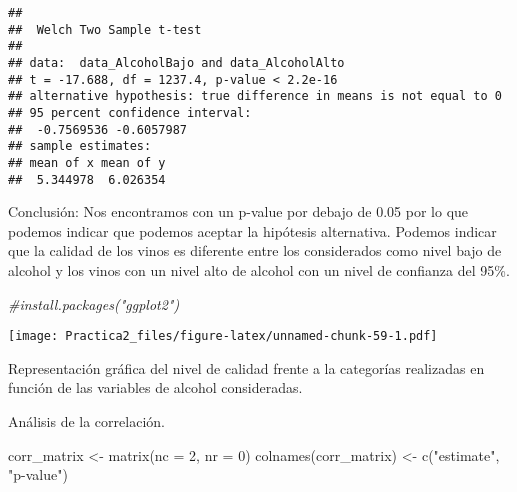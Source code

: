 \documentclass[
]{article}
\newenvironment{Shaded}{\begin{snugshade}}{\end{snugshade}}
\newcommand{\AttributeTok}[1]{\textcolor[rgb]{0.77,0.63,0.00}{#1}}
\newcommand{\CommentTok}[1]{\textcolor[rgb]{0.56,0.35,0.01}{\textit{#1}}}
\newcommand{\DecValTok}[1]{\textcolor[rgb]{0.00,0.00,0.81}{#1}}
\newcommand{\FloatTok}[1]{\textcolor[rgb]{0.00,0.00,0.81}{#1}}
\newcommand{\FunctionTok}[1]{\textcolor[rgb]{0.00,0.00,0.00}{#1}}
\newcommand{\NormalTok}[1]{#1}
\newcommand{\OtherTok}[1]{\textcolor[rgb]{0.56,0.35,0.01}{#1}}
\newcommand{\SpecialCharTok}[1]{\textcolor[rgb]{0.00,0.00,0.00}{#1}}
\newcommand{\StringTok}[1]{\textcolor[rgb]{0.31,0.60,0.02}{#1}}
\begin{document}
\begin{verbatim}
## 
##  Welch Two Sample t-test
## 
## data:  data_AlcoholBajo and data_AlcoholAlto
## t = -17.688, df = 1237.4, p-value < 2.2e-16
## alternative hypothesis: true difference in means is not equal to 0
## 95 percent confidence interval:
##  -0.7569536 -0.6057987
## sample estimates:
## mean of x mean of y 
##  5.344978  6.026354
\end{verbatim}

Conclusión: Nos encontramos con un p-value por debajo de 0.05 por lo que
podemos indicar que podemos aceptar la hipótesis alternativa. Podemos
indicar que la calidad de los vinos es diferente entre los considerados
como nivel bajo de alcohol y los vinos con un nivel alto de alcohol con
un nivel de confianza del 95\%.

\begin{Shaded}
\begin{Highlighting}[]
\CommentTok{\#install.packages("ggplot2")}
\end{Highlighting}
\end{Shaded}

\begin{Shaded}
\end{Shaded}

\texttt{[image: Practica2\_files/figure-latex/unnamed-chunk-59-1.pdf]}

Representación gráfica del nivel de calidad frente a la categorías
realizadas en función de las variables de alcohol consideradas.

Análisis de la correlación.

\begin{Shaded}
\begin{Highlighting}[]
\NormalTok{corr\_matrix }\OtherTok{\textless{}{-}} \FunctionTok{matrix}\NormalTok{(}\AttributeTok{nc =} \DecValTok{2}\NormalTok{, }\AttributeTok{nr =} \DecValTok{0}\NormalTok{)}
\FunctionTok{colnames}\NormalTok{(corr\_matrix) }\OtherTok{\textless{}{-}} \FunctionTok{c}\NormalTok{(}\StringTok{"estimate"}\NormalTok{, }\StringTok{"p{-}value"}\NormalTok{)}
\end{Highlighting}
\end{Shaded}
\end{document}
